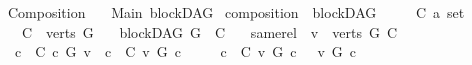 %
\begin{isabellebody}%
%
%
\isadelimtheory
\isanewline
\isanewline
%
\endisadelimtheory
%
\isatagtheory
{}\isamarkupfalse%
\ Composition\isanewline
\ \ \ Main\ blockDAG\isanewline
{}%
\endisatagtheory
{\isafoldtheory}%
%
\isadelimtheory
%
\endisadelimtheory
%
\isadelimdocument
%
\endisadelimdocument
%
\isatagdocument
%
\isamarkuptrue%
%
\endisatagdocument
{\isafolddocument}%
%
\isadelimdocument
%
\endisadelimdocument
{}\isamarkupfalse%
\ composition\ {\isacharequal}{\kern0pt}\ blockDAG\ \ {\isacharplus}{\kern0pt}\isanewline
\ \ \ C\ {\isacharcolon}{\kern0pt}{\isacharcolon}{\kern0pt}{\isachardoublequoteopen}{\isacharprime}{\kern0pt}a\ set{\isachardoublequoteclose}\isanewline
\ \ \ {\isachardoublequoteopen}C\ {\isasymsubseteq}\ verts\ G{\isachardoublequoteclose}\isanewline
\ \ \ {\isachardoublequoteopen}blockDAG\ {\isacharparenleft}{\kern0pt}G\ {\isasymrestriction}\ C{\isacharparenright}{\kern0pt}{\isachardoublequoteclose}\isanewline
\ \ \ same{\isacharunderscore}{\kern0pt}rel{\isacharcolon}{\kern0pt}\ \ {\isachardoublequoteopen}{\isasymforall}v\ {\isasymin}\ {\isacharparenleft}{\kern0pt}{\isacharparenleft}{\kern0pt}verts\ G{\isacharparenright}{\kern0pt}{\isacharminus}{\kern0pt}\ C{\isacharparenright}{\kern0pt}{\isachardot}{\kern0pt}\ \isanewline
\ \ {\isacharparenleft}{\kern0pt}{\isasymforall}c\ {\isasymin}\ C{\isachardot}{\kern0pt}\ {\isacharparenleft}{\kern0pt}c\ {\isasymrightarrow}\isactrlsup {\isacharasterisk}{\kern0pt}\isactrlbsub G\isactrlesub \ v{\isacharparenright}{\kern0pt}{\isacharparenright}{\kern0pt}\ {\isasymor}\ {\isacharparenleft}{\kern0pt}{\isasymforall}c\ {\isasymin}\ C{\isachardot}{\kern0pt}\ {\isacharparenleft}{\kern0pt}v\ {\isasymrightarrow}\isactrlsup {\isacharasterisk}{\kern0pt}\isactrlbsub G\isactrlesub \ c{\isacharparenright}{\kern0pt}{\isacharparenright}{\kern0pt}\ \isanewline
\ \ \ {\isasymor}\ {\isacharparenleft}{\kern0pt}{\isasymforall}c\ {\isasymin}\ C{\isachardot}{\kern0pt}\ {\isasymnot}{\isacharparenleft}{\kern0pt}v\ {\isasymrightarrow}\isactrlsup {\isacharasterisk}{\kern0pt}\isactrlbsub G\isactrlesub \ c{\isacharparenright}{\kern0pt}\ {\isasymand}\ \ {\isasymnot}{\isacharparenleft}{\kern0pt}v\ {\isasymrightarrow}\isactrlsup {\isacharasterisk}{\kern0pt}\isactrlbsub G\isactrlesub \ c{\isacharparenright}{\kern0pt}{\isacharparenright}{\kern0pt}\ {\isachardoublequoteclose}\ \ \ \ \ \ \ \isanewline

\end{isabellebody}
